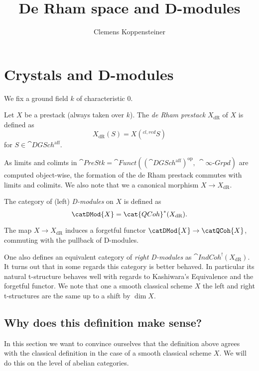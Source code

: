 \documentclass{ck-article}
\title{De Rham space and D-modules}
\author{Clemens Koppensteiner}
\newcommand\dR{{\mathrm{dR}}}
\newcommand\catFunct{\cat{Funct}}
\newcommand\catInftyGrpoid{\cat{\infty\text{-}Grpd}}
\newcommand\catDGSchAff{\cat{DGSch}^{\mathrm{aff}}}
\newcommand\catPreStk{\cat{PreStk}}
\begin{document}
\maketitle

\section{Crystals and D-modules}

We fix a ground field $k$ of characteristic $0$.

\begin{Def}
    Let $X$ be a prestack (always taken over $k$).
    The \emph{de Rham prestack} $X_{\dR}$ of $X$ is defined as
    \[
        X_{\dR}(S) = X(^{cl, red}S)
    \]
    for $S \in \catDGSchAff$.
\end{Def}

As limits and colimts in $\catPreStk = \catFunct((\catDGSchAff)^{\mathrm{op}},\, \catInftyGrpoid)$ are computed object-wise, the formation of the de Rham prestack commutes with limits and colimits.
We also note that we a canonical morphism $X \to X_{\dR}$.

\begin{Def}
    The category of (left) \emph{D-modules} on $X$ is defined as
    \[
        \catDMod{X} = \cat{QCoh}^*(X_{\dR}).
    \]
\end{Def}

The map $X \to X_{\dR}$ induces a forgetful functor $\catDMod{X} \to \catQCoh{X}$, commuting with the pullback of D-modules.

\begin{Rem}
    One also defines an equivalent category of \emph{right D-modules} as $\cat{IndCoh}^!(X_{\dR})$.
    It turns out that in some regards this category is better behaved.
    In particular its natural t-structure behaves well with regards to Kashiwara's Equivalence and the forgetful functor.
    We note that one a smooth classical scheme $X$ the left and right t-structures are the same up to a shift by $\dim X$.
\end{Rem}

\subsection{Why does this definition make sense?}

In this section we want to convince ourselves that the definition above agrees with the classical definition in the case of a smooth classical scheme $X$.
We will do this on the level of abelian categories.
\end{document}
